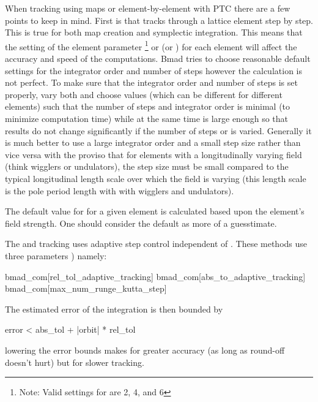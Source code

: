When tracking using maps or element-by-element with PTC there are a few points to keep in
mind. First is that  tracks through a lattice element step by step. This is true for both
map creation and symplectic integration. This means that the setting of the element parameter
\footnote
  {
Note: Valid settings for  are 2, 4, and 6
  }
or  (or ) for each element will affect the accuracy and speed of the
computations. Bmad tries to choose reasonable default settings for the integrator order and number
of steps however the calculation is not perfect. To make sure that the integrator order and number
of steps is set properly, vary both and choose values (which can be different for different
elements) such that the number of steps and integrator order is minimal (to minimize computation
time) while at the same time is large enough so that results do not change significantly if the
number of steps or is varied. Generally it is much better to use a large integrator order and a
small step size rather than vice versa with the proviso that for elements with a longitudinally
varying field (think wigglers or undulators), the step size must be small compared to the typical
longitudinal length scale over which the field is varying (this length scale is the pole period
length with with wigglers and undulators).

The default value for  for a given element is calculated based upon the element's field
strength. One should consider the default as more of a guesstimate.

The  and  tracking uses adaptive step
control independent of . These methods use three  parameters
) namely:
\begin{example}
  bmad_com[rel_tol_adaptive_tracking]
  bmad_com[abs_to_adaptive_tracking]
  bmad_com[max_num_runge_kutta_step]
\end{example}
The estimated error of the integration is then bounded by
\begin{example}
  error < abs_tol + |orbit| * rel_tol
\end{example}
lowering the error bounds makes for greater accuracy (as long as round-off 
doesn't hurt) but for slower tracking. 

